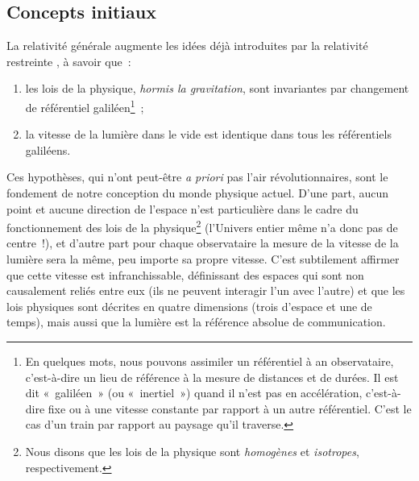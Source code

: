 \documentclass[../main/main.tex]{subfiles}
\begin{document}
\subsection{Concepts initiaux}\label{ssec:RG}

La relativité générale augmente les idées déjà introduites par la relativité
restreinte \citep[voir][et les autres articles de l'\textit{annus
mirabilis}\footnote{C'est ainsi que nous nommons l'année 1905 pendant laquelle
    \textsc{Einstein} publie quatre articles considérés comme étant à l'origine
de la physique moderne.}]{einstein1905}, à savoir que~:
\begin{enumerate}
    \item les lois de la physique, \textit{hormis la gravitation}, sont
        invariantes par changement de référentiel galiléen\footnote{En quelques
            mots, nous pouvons assimiler un référentiel à an observataire,
            c'est-à-dire un lieu de référence à la mesure de distances et de durées.
            Il est dit «~galiléen~» (ou «~inertiel~») quand il n'est
            pas en accélération, c'est-à-dire fixe ou à une vitesse constante par
            rapport à un autre référentiel. C'est le cas d'un train par rapport
          au paysage qu'il traverse.}~;
    \item la vitesse de la lumière dans le vide est identique dans tous les
        référentiels galiléens.
\end{enumerate}

Ces hypothèses, qui n'ont peut-être \textit{a priori} pas l'air
révolutionnaires, sont le fondement de notre conception du monde physique
actuel. D'une part, aucun point et aucune direction de l'espace n'est
particulière dans le cadre du fonctionnement des lois de la
physique\footnote{Nous disons que les lois de la physique sont
\textit{homogènes} et \textit{isotropes}, respectivement.} (l'Univers entier même
n'a donc pas de centre~!), et d'autre part pour chaque observataire la mesure de
la vitesse de la lumière sera la même, peu importe sa propre vitesse. C'est
subtilement affirmer que cette vitesse est infranchissable, définissant des
espaces qui sont non causalement reliés entre eux (ils ne peuvent interagir l'un
avec l'autre) et que les lois physiques sont décrites en quatre dimensions
(trois d'espace et une de temps), mais aussi que la lumière est la référence
absolue de communication.
\end{document}
